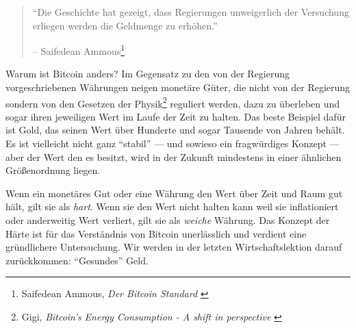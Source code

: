 \begin{quotation}\begin{samepage}
\enquote{Die Geschichte hat gezeigt, dass Regierungen unweigerlich der
Versuchung erliegen werden die Geldmenge zu erhöhen.}
\begin{flushright} -- Saifedean Ammous\footnote{Saifedean Ammous, \textit{Der
Bitcoin Standard} \cite{bitcoin-standard}}
\end{flushright}\end{samepage}\end{quotation}

\newpage
Warum ist Bitcoin anders? Im Gegensatz zu den von der Regierung vorgeschriebenen
Währungen neigen monetäre Güter, die nicht von der Regierung sondern von den
Gesetzen der Physik\footnote{Gigi, \textit{Bitcoin's Energy Consumption - A
shift in perspective} \cite{gigi:energy}} reguliert werden, dazu zu überleben
und sogar ihren jeweiligen Wert im Laufe der Zeit zu halten. Das beste Beispiel
dafür ist Gold, das seinen Wert über Hunderte und sogar Tausende von Jahren
behält. Es ist vielleicht nicht ganz \enquote{stabil} --- und sowieso ein
fragwürdiges Konzept --- aber der Wert den es besitzt, wird in der Zukunft
mindestens in einer ähnlichen Größenordnung liegen.



Wenn ein monetäres Gut oder eine Währung den Wert über Zeit und Raum gut hält,
gilt sie als \textit{hart}. Wenn sie den Wert nicht halten kann weil sie
inflationiert oder anderweitig Wert verliert, gilt sie als \textit{weiche}
Währung. Das Konzept der Härte ist für das Verständnis von Bitcoin unerlässlich
und verdient eine gründlichere Untersuchung. Wir werden in der letzten
Wirtschaftslektion darauf zurückkommen: \enquote{Gesundes} Geld.


